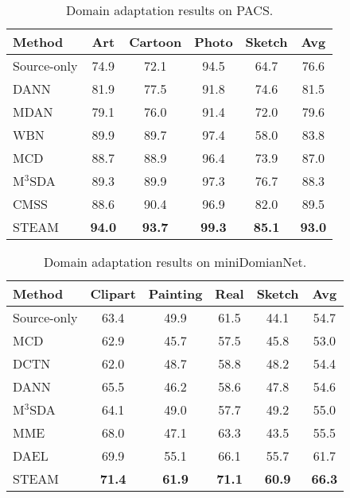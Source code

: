 \documentclass[10pt,twocolumn,letterpaper]{article}
\newcommand{\0}{{\bf 0}}
\begin{document}
\begin{table}[t]
\center
\footnotesize
\renewcommand{\arraystretch}{1.1}
\caption{Domain adaptation results on PACS.}
\vspace{0.2cm}
\begin{tabular}{l | c c c c | c}
\hline
Method & Art & Cartoon & Photo & Sketch & Avg \\
\hline
Source-only & 74.9 & 72.1 & 94.5 & 64.7 & 76.6 \\
DANN \cite{ganin2015unsupervised} & 81.9 & 77.5 & 91.8 & 74.6 & 81.5 \\
MDAN \cite{zhao2018adversarial} &79.1 & 76.0 & 91.4 & 72.0 & 79.6 \\
WBN \cite{mancini2018boosting} & 89.9 & 89.7 & 97.4 & 58.0 & 83.8 \\
MCD \cite{saito2018maximum} &88.7 & 88.9 & 96.4 & 73.9 & 87.0 \\
M$^3$SDA \cite{peng2019moment} & 89.3 & 89.9 & 97.3 &76.7 & 88.3 \\
CMSS \cite{yang2020curriculum} & 88.6 & 90.4 & 96.9 & 82.0 & 89.5 \\
\hline
STEAM & \textbf{94.0} & \textbf{93.7} & \textbf{99.3} & \textbf{85.1} & \textbf{93.0} \\
\hline
\end{tabular}
\vspace{-0.1in}
\label{tab:pacs-da}
\end{table}

\begin{table}[t]
\center
\footnotesize
\renewcommand{\arraystretch}{1.1}
\caption{Domain adaptation results on miniDomianNet.}
\vspace{0.2cm}
\begin{tabular}{l | c c c c | c}
\hline
Method & Clipart & Painting & Real & Sketch & Avg \\
\hline
Source-only & 63.4 & 49.9 & 61.5 & 44.1 & 54.7 \\
MCD \cite{saito2018maximum} & 62.9 & 45.7 & 57.5 & 45.8 & 53.0 \\
DCTN~\cite{xu2018deep} &62.0 & 48.7 & 58.8 & 48.2 & 54.4 \\
DANN \cite{ganin2015unsupervised} & 65.5 & 46.2 & 58.6 & 47.8 & 54.6 \\
M$^3$SDA \cite{peng2019moment} & 64.1 & 49.0 & 57.7 & 49.2 & 55.0 \\
MME \cite{saito2019semi} & 68.0 & 47.1 & 63.3 & 43.5 & 55.5\\
DAEL \cite{zhou2020domain} & 69.9 & 55.1 & 66.1 &55.7 & 61.7 \\
\hline
STEAM & \textbf{71.4} & \textbf{61.9} & \textbf{71.1} & \textbf{60.9} & \textbf{66.3} \\
\hline
\end{tabular}
\vspace{-0.4cm}
\label{tab:minidomainnet-da}
\end{table}
\end{document}
